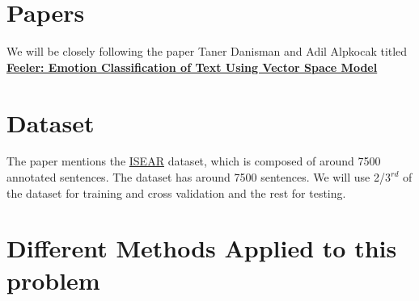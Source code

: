 
\newpage
\section{Papers}
\label{paper-details}
 We will be closely following the paper Taner Danisman and Adil Alpkocak titled \href{http://people.cs.deu.edu.tr/alpkocak/Papers/AISB08.pdf}{\textbf{Feeler: Emotion Classification of Text Using Vector Space Model}}

\section{Dataset}
The paper mentions the \href{https://github.com/bogdanneacsa/tts-master/blob/master/ISEAR/DATA.csv}{ISEAR} dataset, which is composed of around 7500 annotated sentences. The dataset has around 7500 sentences. We will use 2/$3^{rd}$ of the dataset for training and cross validation and the rest for testing.

\section{Different Methods Applied to this problem}
